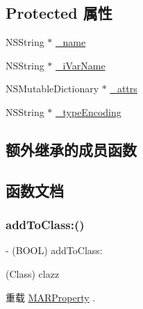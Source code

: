 \subsection*{Protected 属性}
\begin{DoxyCompactItemize}
\item 
N\+S\+String $\ast$ \hyperlink{interface___m_a_r_components_property_a355d7daa336fbacce058ec4a1e0bbb4b}{\+\_\+name}
\item 
N\+S\+String $\ast$ \hyperlink{interface___m_a_r_components_property_a3222cadf416bbae27eb90356897885de}{\+\_\+i\+Var\+Name}
\item 
N\+S\+Mutable\+Dictionary $\ast$ \hyperlink{interface___m_a_r_components_property_a620421c9e624655956aece97a9bcee5d}{\+\_\+attrs}
\item 
N\+S\+String $\ast$ \hyperlink{interface___m_a_r_components_property_a9d0ec6baa2da8cd069919aa754180545}{\+\_\+type\+Encoding}
\end{DoxyCompactItemize}
\subsection*{额外继承的成员函数}


\subsection{函数文档}
\mbox{\label{interface___m_a_r_components_property_a4199443a1614ab878f3a552d14ebad71}} 
\subsubsection{\texorpdfstring{add\+To\+Class\+:()}{addToClass:()}}
{\footnotesize\ttfamily -\/ (B\+O\+OL) add\+To\+Class\+: \begin{DoxyParamCaption}\item[{(Class)}]{clazz }\end{DoxyParamCaption}\hspace{0.3cm}{\ttfamily [implementation]}}



重载 \hyperlink{interface_m_a_r_property_a820be7200a12cbb0dde67453030a6f90}{M\+A\+R\+Property} .

